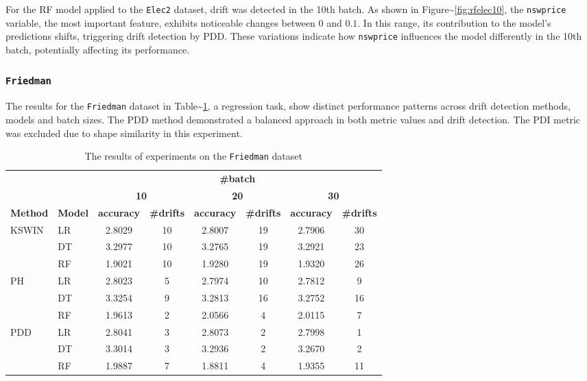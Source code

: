 For the RF model applied to the \texttt{Elec2} dataset, drift was detected in the 10th batch. As shown in Figure\textasciitilde{}\ref{fig:rfelec10}, the \texttt{nswprice} variable, the most important feature, exhibits noticeable changes between \(0\) and \(0.1\). In this range, its contribution to the model's predictions shifts, triggering drift detection by PDD. These variations indicate how \texttt{nswprice} influences the model differently in the 10th batch, potentially affecting its performance.

\hypertarget{section-5}{%
\subsubsection{\texorpdfstring{\texttt{Friedman}}{}}\label{section-5}}

The results for the \texttt{Friedman} dataset in Table\textasciitilde{}\ref{tab:exp_Friedman}, a regression task, show distinct performance patterns across drift detection methods, models and batch sizes. The PDD method demonstrated a balanced approach in both metric values and drift detection. The PDI metric was excluded due to shape similarity in this experiment.

\begin{table}[H]
    \centering
    \small
    \caption{The results of experiments on the \texttt{Friedman} dataset}
    \label{tab:exp_Friedman}
    \begin{tabular}{llcccccc}\toprule
        && \multicolumn{6}{c}{\textbf{\#batch}}\\\cmidrule(lr){3-8}
        && \multicolumn{2}{c}{\textbf{10}}    & \multicolumn{2}{c}{\textbf{20}} & \multicolumn{2}{c}{\textbf{30}} \\\cmidrule(lr){3-8}
        \textbf{Method} & \textbf{Model} & \textbf{accuracy} & \textbf{\#drifts} & \textbf{accuracy} & \textbf{\#drifts} & \textbf{accuracy} & \textbf{\#drifts} \\\midrule
        KSWIN & LR & 2.8029 & 10 & 2.8007 & 19 & 2.7906 & 30 \\
        & DT & 3.2977 & 10 & 3.2765 & 19 & 3.2921 & 23 \\
        & RF & 1.9021 & 10 & 1.9280 & 19 & 1.9320 & 26 \\
        \midrule
        PH & LR & 2.8023 & 5 & 2.7974 & 10 & 2.7812 & 9 \\
        & DT & 3.3254 & 9 & 3.2813 & 16 & 3.2752 & 16 \\
        & RF & 1.9613 & 2 & 2.0566 & 4 & 2.0115 & 7 \\
        \midrule
        PDD & LR & 2.8041 & 3 & 2.8073 & 2 & 2.7998 & 1 \\
        & DT & 3.3014 & 3 & 3.2936 & 2 & 3.2670 & 2 \\
        & RF & 1.9887 & 7 & 1.8811 & 4 & 1.9355 & 11 \\
        \midrule
    \end{tabular}
\end{table}

